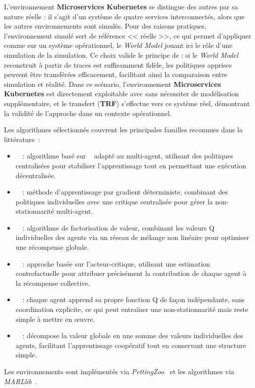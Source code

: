 L'environnement \textbf{Microservices Kubernetes} se distingue des autres par sa nature réelle : il s'agit d'un système de quatre services interconnectés, alors que les autres environnements sont simulés. Pour des raisons pratiques, l'environnement simulé sert de référence << réelle >>, ce qui permet d'appliquer  comme sur un système opérationnel, le \textit{World Model} jouant ici le rôle d'une simulation de la simulation. Ce choix valide le principe de  : si le \textit{World Model} reconstruit à partir de traces est suffisamment fidèle, les politiques apprises peuvent être transférées efficacement, facilitant ainsi la comparaison entre simulation et réalité. Dans ce scénario, l'environnement \textbf{Microservices Kubernetes} est directement exploitable avec  sans nécessiter de modélisation supplémentaire, et le transfert (\textbf{TRF}) s'effectue vers ce système réel, démontrant la validité de l'approche dans un contexte opérationnel.

\medskip

Les algorithmes  sélectionnés couvrent les principales familles reconnues dans la littérature~:
\begin{itemize}
  \item {}~\cite{Yu2022}~: algorithme basé sur ~\cite{Schulman2017} adapté au multi-agent, utilisant des politiques centralisées pour stabiliser l'apprentissage tout en permettant une exécution décentralisée.
  \item {}~\cite{lowe2017multi}~: méthode d'apprentissage par gradient déterministe, combinant des politiques individuelles avec une critique centralisée pour gérer la non-stationnarité multi-agent.
  \item {}~\cite{rashid2018qmix}~: algorithme de factorisation de valeur, combinant les valeurs Q individuelles des agents via un réseau de mélange non linéaire pour optimiser une récompense globale.
  \item {}~\cite{foerster2018counterfactual}~: approche basée sur l'acteur-critique, utilisant une estimation contrefactuelle pour attribuer précisément la contribution de chaque agent à la récompense collective.
  \item {}~\cite{Jiang2022}~: chaque agent apprend sa propre fonction Q de façon indépendante, sans coordination explicite, ce qui peut entraîner une non-stationnarité mais reste simple à mettre en œuvre.
  \item {}~\cite{sunehag2018value}~: décompose la valeur globale en une somme des valeurs individuelles des agents, facilitant l'apprentissage coopératif tout en conservant une structure simple.
\end{itemize}
Les environnements sont implémentés via \textit{PettingZoo}~\cite{terry2020pettingzoo} et les algorithmes via \textit{MARLlib}~\cite{hu2022marllib}.

